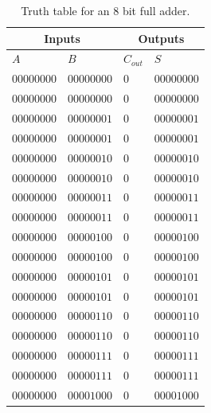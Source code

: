 \documentclass[conference]{IEEEtran}
\begin{document}
	\begin{table}
		\centering
		\begin{tabular}{|m{1.2cm}|m{1.2cm}|m{0.5cm}|m{1.2cm}|}
			\hline
			\multicolumn{2}{|c|}{Inputs} & \multicolumn{2}{c|}{Outputs} \\
			\hline
			\(A\) & \(B\) & \(C_{out}\) & \(S\) \\
			\centering\(00000000\) & \centering\(00000000\) & \centering\(0\) & \(00000000\) \\ \hline
			\centering\(00000000\) & \centering\(00000000\) & \centering\(0\) & \(00000000\) \\ \hline
			\centering\(00000000\) & \centering\(00000001\) & \centering\(0\) & \(00000001\) \\ \hline
			\centering\(00000000\) & \centering\(00000001\) & \centering\(0\) & \(00000001\) \\ \hline
			\centering\(00000000\) & \centering\(00000010\) & \centering\(0\) & \(00000010\) \\ \hline
			\centering\(00000000\) & \centering\(00000010\) & \centering\(0\) & \(00000010\) \\ \hline
			\centering\(00000000\) & \centering\(00000011\) & \centering\(0\) & \(00000011\) \\ \hline
			\centering\(00000000\) & \centering\(00000011\) & \centering\(0\) & \(00000011\) \\ \hline
			\centering\(00000000\) & \centering\(00000100\) & \centering\(0\) & \(00000100\) \\ \hline
			\centering\(00000000\) & \centering\(00000100\) & \centering\(0\) & \(00000100\) \\ \hline
			\centering\(00000000\) & \centering\(00000101\) & \centering\(0\) & \(00000101\) \\ \hline
			\centering\(00000000\) & \centering\(00000101\) & \centering\(0\) & \(00000101\) \\ \hline
			\centering\(00000000\) & \centering\(00000110\) & \centering\(0\) & \(00000110\) \\ \hline
			\centering\(00000000\) & \centering\(00000110\) & \centering\(0\) & \(00000110\) \\ \hline
			\centering\(00000000\) & \centering\(00000111\) & \centering\(0\) & \(00000111\) \\ \hline
			\centering\(00000000\) & \centering\(00000111\) & \centering\(0\) & \(00000111\) \\ \hline
			\centering\(00000000\) & \centering\(00001000\) & \centering\(0\) & \(00001000\) \\ \hline
			
			\hline
		\end{tabular}
		\caption{Truth table for an 8 bit full adder.}
		\label{tab:FA_8B_TT}
	\end{table}
	
\end{document}
